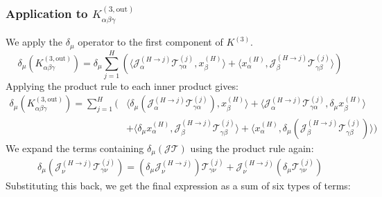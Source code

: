 \documentclass[11pt,a4paper]{article}
\theoremstyle{definition}
\begin{document}













\subsubsection{Application to $K^{(3, \text{out})}_{\alpha\beta\gamma}$}
We apply the $\delta_\mu$ operator to the first component of $K^{(3)}$.
\begin{equation}
    \delta_\mu(K^{(3, \text{out})}_{\alpha\beta\gamma}) = \delta_\mu \sum_{j=1}^{H} \left( \langle \mathcal{J}^{(H \to j)}_{\alpha} \mathcal{T}^{(j)}_{\gamma\alpha}, x^{(H)}_\beta \rangle + \langle x^{(H)}_\alpha, \mathcal{J}^{(H \to j)}_{\beta} \mathcal{T}^{(j)}_{\gamma\beta} \rangle \right)
\end{equation}
Applying the product rule to each inner product gives:
\begin{align}
\delta_\mu(K^{(3, \text{out})}_{\alpha\beta\gamma}) = \sum_{j=1}^{H} \Biggl( & \langle \delta_\mu(\mathcal{J}^{(H \to j)}_{\alpha} \mathcal{T}^{(j)}_{\gamma\alpha}), x^{(H)}_\beta \rangle + \langle \mathcal{J}^{(H \to j)}_{\alpha} \mathcal{T}^{(j)}_{\gamma\alpha}, \delta_\mu x^{(H)}_\beta \rangle \nonumber \\
& + \langle \delta_\mu x^{(H)}_\alpha, \mathcal{J}^{(H \to j)}_{\beta} \mathcal{T}^{(j)}_{\gamma\beta} \rangle + \langle x^{(H)}_\alpha, \delta_\mu(\mathcal{J}^{(H \to j)}_{\beta} \mathcal{T}^{(j)}_{\gamma\beta}) \rangle \Biggr)
\end{align}
We expand the terms containing $\delta_\mu(\mathcal{J}\mathcal{T})$ using the product rule again:
\begin{align}
\delta_\mu(\mathcal{J}^{(H \to j)}_{\nu} \mathcal{T}^{(j)}_{\gamma\nu}) = (\delta_\mu \mathcal{J}^{(H \to j)}_{\nu}) \mathcal{T}^{(j)}_{\gamma\nu} + \mathcal{J}^{(H \to j)}_{\nu} (\delta_\mu \mathcal{T}^{(j)}_{\gamma\nu})
\end{align}
Substituting this back, we get the final expression as a sum of six types of terms:
\end{document}
